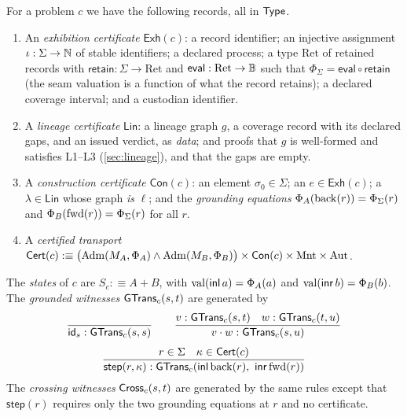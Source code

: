 \begin{defi}[Certificates]\label{def:certs}
For a problem $c$ we have the following records, all in $\mathsf{Type}$.
\begin{enumerate}
\item An \emph{exhibition certificate} $\mathsf{Exh}(c)$: a record identifier; an injective assignment $\iota : \Sigma \to \mathbb{N}$ of stable identifiers; a declared process; a type $\mathrm{Ret}$ of retained records with $\mathsf{retain} : \Sigma \to \mathrm{Ret}$ and $\mathsf{eval} : \mathrm{Ret} \to \mathbb{B}$ such that $\Phi_\Sigma = \mathsf{eval} \circ \mathsf{retain}$ (the seam valuation is a function of what the record retains); a declared coverage interval; and a custodian identifier.
\item A \emph{lineage certificate} $\mathsf{Lin}$: a lineage graph $g$, a coverage record with its declared gaps, and an issued verdict, as \emph{data}; and proofs that $g$ is well-formed and satisfies L1--L3 (\cref{sec:lineage}), and that the gaps are empty.
\item A \emph{construction certificate} $\mathsf{Con}(c)$: an element $\sigma_0 \in \Sigma$; an $e \in \mathsf{Exh}(c)$; a $\lambda \in \mathsf{Lin}$ whose graph \emph{is} $\ell$; and the \emph{grounding equations} $\Phi_A(\mathrm{back}(r)) = \Phi_\Sigma(r)$ and $\Phi_B(\mathrm{fwd}(r)) = \Phi_\Sigma(r)$ for all $r$.
\item A \emph{certified transport} $\mathsf{Cert}(c) :\equiv \bigl(\mathrm{Adm}(M_A,\Phi_A) \wedge \mathrm{Adm}(M_B,\Phi_B)\bigr) \times \mathsf{Con}(c) \times \mathrm{Mnt} \times \mathrm{Aut}$.
\end{enumerate}
\end{defi}

\begin{defi}\label{def:gtrans}
The \emph{states} of $c$ are $S_c :\equiv A + B$, with $\mathrm{val}(\mathsf{inl}\,a) = \Phi_A(a)$ and $\mathrm{val}(\mathsf{inr}\,b) = \Phi_B(b)$. The \emph{grounded witnesses} $\mathsf{GTrans}_c(s,t)$ are generated by
\begin{gather*}
\frac{}{\mathsf{id}_s : \mathsf{GTrans}_c(s,s)}\qquad
\frac{v : \mathsf{GTrans}_c(s,t) \quad w : \mathsf{GTrans}_c(t,u)}{v \cdot w : \mathsf{GTrans}_c(s,u)}\\[4pt]
\frac{r \in \Sigma \quad \kappa \in \mathsf{Cert}(c)}{\mathsf{step}(r,\kappa) : \mathsf{GTrans}_c(\mathsf{inl}\,\mathrm{back}(r),\ \mathsf{inr}\,\mathrm{fwd}(r))}
\end{gather*}
The \emph{crossing witnesses} $\mathsf{Cross}_c(s,t)$ are generated by the same rules except that $\mathsf{step}(r)$ requires only the two grounding equations at $r$ and no certificate.
\end{defi}

